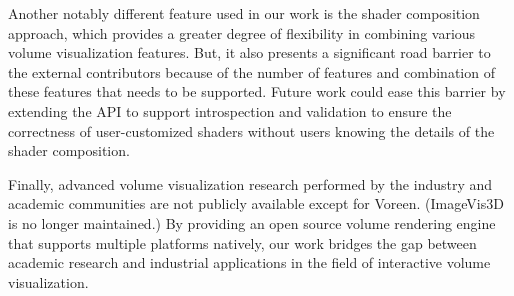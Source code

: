 Another notably different feature used in our work is the shader composition
approach, which provides a greater degree of flexibility in combining various
volume visualization features. But, it also presents a significant road barrier
to the external contributors because of the number of features and combination
of these features that needs to be supported. Future work could ease this
barrier by extending the API to support introspection and validation to ensure
the correctness of user-customized shaders without users knowing the details of
the shader composition.

Finally, advanced volume visualization research performed by the industry and
academic communities are not publicly available except for Voreen.  (ImageVis3D
is no longer maintained.) By providing an open source volume rendering engine
that supports multiple platforms natively, our work bridges the gap between
academic research and industrial applications in the field of interactive volume
visualization.
